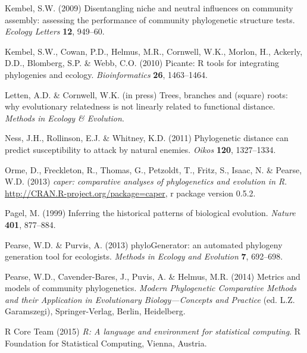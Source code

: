 \documentclass{bioinfo}
\begin{document}
\begin{thebibliography}{30}
Kembel, S.W. (2009) {Disentangling niche and neutral influences on community
  assembly: assessing the performance of community phylogenetic structure
  tests}. \emph{Ecology Letters} \textbf{12}, 949--60.

Kembel, S.W., Cowan, P.D., Helmus, M.R., Cornwell, W.K., Morlon, H., Ackerly,
  D.D., Blomberg, S.P. \& Webb, C.O. (2010) Picante: R tools for integrating
  phylogenies and ecology. \emph{Bioinformatics} \textbf{26}, 1463--1464.

 Letten, A.D. \& Cornwell, W.K. (in press)
  Trees, branches and (square) roots: why evolutionary relatedness is
  not linearly related to functional distance. \emph{Methods in
    Ecology \& Evolution}.

Ness, J.H., Rollinson, E.J. \& Whitney, K.D. (2011) Phylogenetic distance can
  predict susceptibility to attack by natural enemies. \emph{Oikos}
  \textbf{120}, 1327--1334.

Orme, D., Freckleton, R., Thomas, G., Petzoldt, T., Fritz, S., Isaac, N. \&
  Pearse, W.D. (2013) \emph{caper: comparative analyses of phylogenetics and
  evolution in {R}}. \urlprefix\url{http://CRAN.R-project.org/package=caper}, r
  package version 0.5.2.

Pagel, M. (1999) {Inferring the historical patterns of biological evolution}.
  \emph{Nature} \textbf{401}, 877--884.

 Pearse, W.D. \& Purvis,
  A. (2013) phyloGenerator: an automated phylogeny generation tool for
  ecologists. \emph{Methods in Ecology and Evolution} \textbf{7},
  692--698.

Pearse, W.D., Cavender-Bares, J., Puvis, A. \& Helmus, M.R. (2014) Metrics and
  models of community phylogenetics. \emph{Modern Phylogenetic Comparative
  Methods and their Application in Evolutionary Biology---Concepts and
  Practice} (ed. L.Z. Garamszegi), Springer-Verlag, Berlin, Heidelberg.

{R Core Team} (2015) \emph{R: A language and environment for statistical
  computing}. R Foundation for Statistical Computing, Vienna, Austria.


\end{thebibliography}
\end{document}
